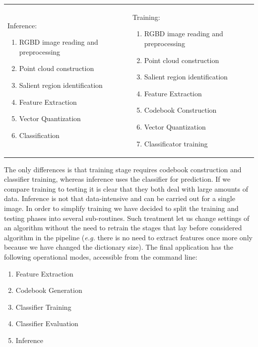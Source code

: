 	\begin{tabular}{p{}p{}}
		Inference:
		\begin{enumerate}
			\item RGBD image reading and preprocessing
			\item Point cloud construction
			\item Salient region identification
			\item Feature Extraction
			\item Vector Quantization
			\item Classification
		\end{enumerate} 
		&
		Training:
		\begin{enumerate}
		\item RGBD image reading and preprocessing
		\item Point cloud construction
		\item Salient region identification
		\item Feature Extraction
		\item Codebook Construction
		\item Vector Quantization
		\item Classificator training
		\end{enumerate} \\
	\end{tabular}
	
	The only differences is that training stage requires codebook construction and classifier training, whereas inference uses the classifier for prediction. If we compare training to testing it is clear that they both deal with large amounts of data. Inference is not that data-intensive and can be carried out for a single image. In order to simplify training we have decided to split the training and testing phases into several sub-routines. Such treatment let us change settings of an algorithm without the need to retrain the stages that lay before considered algorithm in the pipeline (\emph{e.g.} there is no need to extract features once more only because we have changed the dictionary size). The final application has the following operational modes, accessible from the command line:
	
	\begin{enumerate}
		\item Feature Extraction
		\item Codebook Generation
		\item Classifier Training
		\item Classifier Evaluation
		\item Inference
	\end{enumerate}
	
